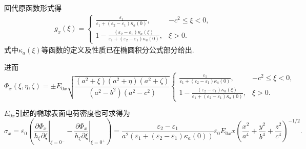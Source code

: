 回代原函数形式得
\begin{align*}
	g_x(\xi) =
	\begin{cases}
		\displaystyle\frac{\varepsilon_1 }{\varepsilon_1 + (\varepsilon_2 - \varepsilon_1)\kappa_a(0)},                                    & -c^2 \leq \xi < 0, \\[8pt]
		\displaystyle 1 - \frac{(\varepsilon_2 - \varepsilon_1)\kappa_a(\xi)}{\varepsilon_1 + (\varepsilon_2 - \varepsilon_1)\kappa_a(0)}, & \xi > 0.
	\end{cases}
\end{align*}
式中\(\kappa_a(\xi)\)等函数的定义及性质已在椭圆积分公式部分给出.

进而
\begin{equation}
	\Phi_x(\xi, \eta, \zeta)=\pm E_{0x}\sqrt{\frac{(a^2+\xi)(a^2+\eta)(a^2+\zeta)}{(a^2-b^2)(a^2-c^2)}}\begin{cases}
		\displaystyle\frac{\varepsilon_1 }{\varepsilon_1 + (\varepsilon_2 - \varepsilon_1)\kappa_a(0)},                                    & -c^2 \leq \xi < 0, \\[8pt]
		\displaystyle 1 - \frac{(\varepsilon_2 - \varepsilon_1)\kappa_a(\xi)}{\varepsilon_1 + (\varepsilon_2 - \varepsilon_1)\kappa_a(0)}, & \xi > 0.
	\end{cases}
\end{equation}

\(E_{0x}\)引起的椭球表面电荷密度也可求得为
\begin{equation}
	\sigma_x = \varepsilon_0 \left(
	\left. \frac{\partial \Phi_x}{h_\xi \partial \xi} \right|_{\xi = 0^-} -
	\left. \frac{\partial \Phi_x}{h_\xi \partial \xi} \right|_{\xi = 0^+}
	\right) = \frac{\varepsilon_2 - \varepsilon_1}{a^2 \left( \varepsilon_1 + (\varepsilon_2 - \varepsilon_1) \kappa_a(0) \right)} \varepsilon_0 E_{0x} x \left( \frac{x^2}{a^4} + \frac{y^2}{b^4} + \frac{z^2}{c^4} \right)^{-1/2}.
\end{equation}

